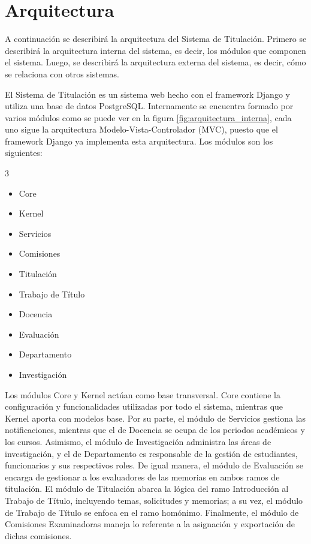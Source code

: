 \section{Arquitectura}\label{sec:arquitectura}
A continuación se describirá la arquitectura del Sistema de Titulación. Primero se
describirá la arquitectura interna del sistema, es decir, los módulos que componen el
sistema. Luego, se describirá la arquitectura externa del sistema, es decir, cómo se
relaciona con otros sistemas.

El Sistema de Titulación es un sistema web hecho con el framework Django y utiliza una
base de datos PostgreSQL. Internamente se encuentra formado por varios módulos como se
puede ver en la figura \ref{fig:arquitectura_interna}, cada uno sigue la arquitectura
Modelo-Vista-Controlador (MVC), puesto que el framework Django ya implementa esta
arquitectura. Los módulos son los siguientes:
\begin{multicols}{3}
  \begin{itemize}
    \item Core
    \item Kernel
    \item Servicios
    \item Comisiones
    \item Titulación
    \item Trabajo de Título
    \item Docencia
    \item Evaluación
    \item Departamento
    \item Investigación
  \end{itemize}
\end{multicols}

Los módulos Core y Kernel actúan como base transversal. Core contiene la configuración y
funcionalidades utilizadas por todo el sistema, mientras que Kernel aporta con modelos base.
Por su parte, el módulo de Servicios gestiona las notificaciones, mientras que el de Docencia se ocupa de los periodos
académicos y los cursos. Asimismo, el módulo de Investigación administra las áreas de
investigación, y el de Departamento es responsable de la gestión de estudiantes,
funcionarios y sus respectivos roles. De igual manera, el módulo de Evaluación se encarga
de gestionar a los evaluadores de las memorias en ambos ramos de titulación. El módulo de
Titulación abarca la lógica del ramo Introducción al Trabajo de Título, incluyendo temas,
solicitudes y memorias; a su vez, el módulo de Trabajo de Título se enfoca en el ramo
homónimo. Finalmente, el módulo de Comisiones Examinadoras maneja lo referente a la
asignación y exportación de dichas comisiones.

